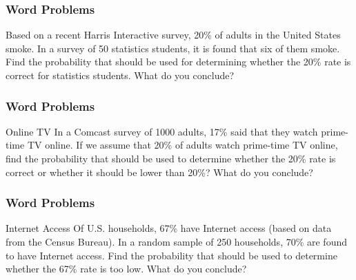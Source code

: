 \documentclass[xcolor=dvipsnames]{beamer}
\begin{document}
\begin{frame}
  \frametitle{Word Problems}
  {\ubung} Based on a recent Harris Interactive survey, 20\% of adults
  in the United States smoke. In a survey of 50 statistics students,
  it is found that six of them smoke. Find the probability that should
  be used for determining whether the 20\% rate is correct for
  statistics students. What do you conclude?
\end{frame}

\begin{frame}
  \frametitle{Word Problems}
  {\ubung} Online TV In a Comcast survey of 1000 adults, 17\% said
  that they watch prime-time TV online. If we assume that 20\% of
  adults watch prime-time TV online, find the probability that should
  be used to determine whether the 20\% rate is correct or whether it
  should be lower than 20\%? What do you conclude?
\end{frame}

\begin{frame}
  \frametitle{Word Problems}
  {\ubung} Internet Access Of U.S. households, 67\% have Internet
  access (based on data from the Census Bureau). In a random sample of
  250 households, 70\% are found to have Internet access. Find the
  probability that should be used to determine whether the 67\% rate
  is too low. What do you conclude?
\end{frame}


\end{document}
